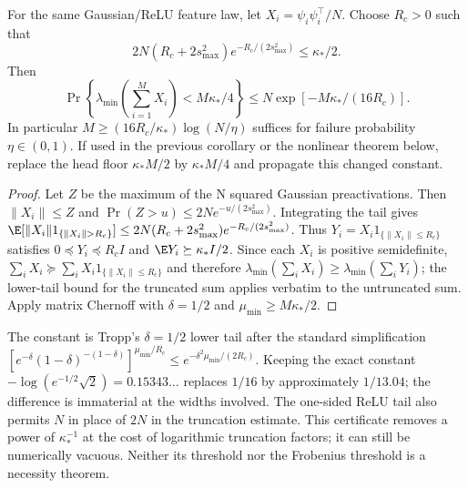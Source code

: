 \begin{proposition}
\label{prop:astra_chernoff}
For the same Gaussian/ReLU feature law, let $X_i=\psi_i\psi_i^\top/N$.
Choose $R_c>0$ such that
\[
 2N(R_c+2s_{\max}^2)e^{-R_c/(2s_{\max}^2)}\le\kappa_*/2.
\]
Then
\begin{equation}\label{eq:astra_chernoff}
 \Pr\left\{\lambda_{\min}\left(\sum_{i=1}^M X_i\right)
               <M\kappa_*/4\right\}
 \le N\exp[-M\kappa_*/(16R_c)].
\end{equation}
In particular $M\ge(16R_c/\kappa_*)\log(N/\eta)$ suffices for failure
probability $\eta\in(0,1)$. If used in the previous corollary or the
nonlinear theorem below, replace the head floor $\kappa_*M/2$ by
$\kappa_*M/4$ and propagate this changed constant.
\end{proposition}
\begin{proof}
Let $Z$ be the maximum of the N squared Gaussian preactivations.
Then $\|X_i\|\le Z$ and $\Pr(Z>u)\le2N e^{-u/(2s_{\max}^2)}$.
Integrating the tail gives
$\E[\|X_i\|1_{\{\|X_i\|>R_c\}}]
\le2N(R_c+2s_{\max}^2)e^{-R_c/(2s_{\max}^2)}$.
Thus $Y_i=X_i1_{\{\|X_i\|\le R_c\}}$ satisfies
$0\preceq Y_i\preceq R_cI$ and $\E Y_i\succeq\kappa_*I/2$.
Since each $X_i$ is positive semidefinite,
$\sum_iX_i\succeq\sum_iX_i1_{\{\|X_i\|\le R_c\}}$ and therefore
$\lambda_{\min}(\sum_iX_i)\ge\lambda_{\min}(\sum_iY_i)$; the
lower-tail bound for the truncated sum applies verbatim to the
untruncated sum. Apply matrix Chernoff \citep{astra_tropp2012} with
$\delta=1/2$ and $\mu_{\min}\ge M\kappa_*/2$.
\end{proof}
\begin{remark}
The constant is Tropp's $\delta=1/2$ lower tail after the standard
simplification
$[e^{-\delta}(1-\delta)^{-(1-\delta)}]^{\mu_{\min}/R_c}
\le e^{-\delta^2\mu_{\min}/(2R_c)}$.
Keeping the exact constant $-\log(e^{-1/2}\sqrt2)=0.15343\ldots$
replaces $1/16$ by approximately $1/13.04$; the difference is immaterial
at the widths involved. The one-sided ReLU tail also permits $N$ in
place of $2N$ in the truncation estimate. This certificate removes a
power of $\kappa_*^{-1}$ at the cost of logarithmic truncation factors;
it can still be numerically vacuous. Neither its threshold nor the
Frobenius threshold is a necessity theorem.
\end{remark}

